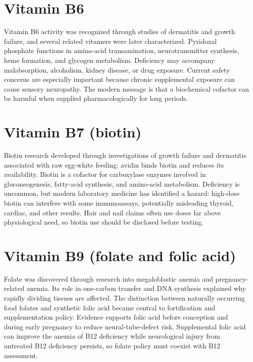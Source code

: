 \section{Vitamin B6}
Vitamin B6 activity was recognized through studies of dermatitis and growth failure, and several related vitamers were later characterized. Pyridoxal phosphate functions in amino-acid transamination, neurotransmitter synthesis, heme formation, and glycogen metabolism. Deficiency may accompany malabsorption, alcoholism, kidney disease, or drug exposure. Current safety concerns are especially important because chronic supplemental exposure can cause sensory neuropathy. The modern message is that a biochemical cofactor can be harmful when supplied pharmacologically for long periods. \cite{historyNutrition,odsB6}

\section{Vitamin B7 (biotin)}
Biotin research developed through investigations of growth failure and dermatitis associated with raw egg-white feeding; avidin binds biotin and reduces its availability. Biotin is a cofactor for carboxylase enzymes involved in gluconeogenesis, fatty-acid synthesis, and amino-acid metabolism. Deficiency is uncommon, but modern laboratory medicine has identified a hazard: high-dose biotin can interfere with some immunoassays, potentially misleading thyroid, cardiac, and other results. Hair and nail claims often use doses far above physiological need, so biotin use should be disclosed before testing. \cite{historyNutrition,odsBiotin,fdaBiotin}

\section{Vitamin B9 (folate and folic acid)}
Folate was discovered through research into megaloblastic anemia and pregnancy-related anemia. Its role in one-carbon transfer and DNA synthesis explained why rapidly dividing tissues are affected. The distinction between naturally occurring food folates and synthetic folic acid became central to fortification and supplementation policy. Evidence supports folic acid before conception and during early pregnancy to reduce neural-tube-defect risk. Supplemental folic acid can improve the anemia of B12 deficiency while neurological injury from untreated B12 deficiency persists, so folate policy must coexist with B12 assessment. \cite{historyNutrition,cdcFolate,odsFolate,odsB12}

